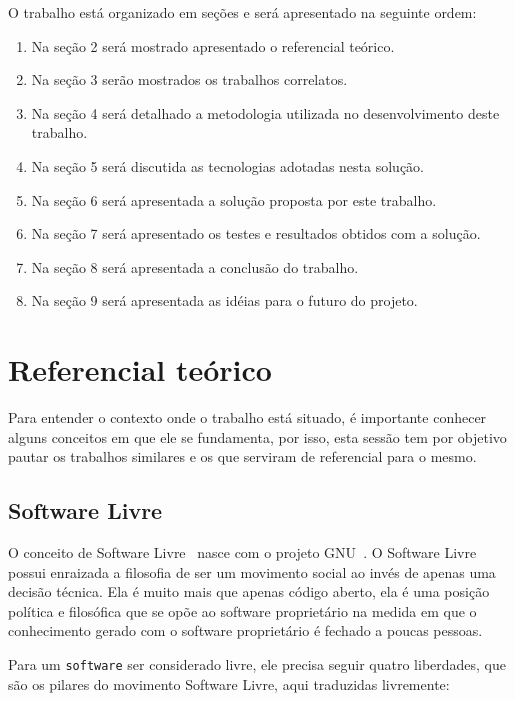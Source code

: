 \documentclass[final,12pt, times, 5p, twocolumn]{elsarticle}
\begin{document}
O trabalho está organizado em seções e será apresentado na seguinte ordem:

\begin{enumerate}	
    \item Na seção 2 será mostrado apresentado o referencial teórico. 
    \item Na seção 3 serão mostrados os trabalhos correlatos.
    \item Na seção 4 será detalhado a metodologia utilizada no desenvolvimento deste trabalho.
    \item Na seção 5 será discutida as tecnologias adotadas nesta solução.
    \item Na seção 6 será apresentada a solução proposta por este trabalho.
    \item Na seção 7 será apresentado os testes e resultados obtidos com a solução.
    \item Na seção 8 será apresentada a conclusão do trabalho.
    \item Na seção 9 será apresentada as idéias para o futuro do projeto.
\end{enumerate}

\section{Referencial teórico}

Para entender o contexto onde o trabalho está situado, é importante conhecer alguns conceitos em que ele se fundamenta, por isso, esta sessão tem por objetivo pautar os trabalhos similares e os que serviram de referencial para o mesmo.

\subsection{Software Livre}

O conceito de Software Livre~\cite{softwareLivre} nasce com o projeto GNU~\cite{GNU}. O Software Livre possui enraizada a filosofia de ser um movimento social ao invés de apenas uma decisão técnica. Ela é muito mais que apenas código aberto, ela é uma posição política e filosófica que se opõe ao software proprietário na medida em que o conhecimento gerado com o software proprietário é fechado a poucas pessoas.

Para um \texttt{software} ser considerado livre, ele precisa seguir quatro liberdades, que são os pilares do movimento Software Livre, aqui traduzidas livremente:
\end{document}
